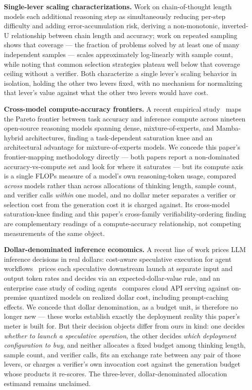 \documentclass[11pt]{article}
\begin{document}
\textbf{Single-lever scaling characterizations.} Work on chain-of-thought length~\citep{CoTLength6QDF} models each additional reasoning step as simultaneously reducing per-step difficulty and adding error-accumulation risk, deriving a non-monotonic, inverted-U relationship between chain length and accuracy; work on repeated sampling~\citep{BrownMonkeys240721787} shows that coverage --- the fraction of problems solved by at least one of many independent samples --- scales approximately log-linearly with sample count, while noting that common selection strategies plateau well below that coverage ceiling without a verifier. Both characterize a single lever's scaling behavior in isolation, holding the other two levers fixed, with no mechanism for normalizing that lever's value against what the other two levers would have cost.

\textbf{Cross-model compute-accuracy frontiers.} A recent empirical study~\citep{ComputeAccuracy251224776} maps the Pareto frontier between task accuracy and inference compute across nineteen open-source reasoning models spanning dense, mixture-of-experts, and Mamba-hybrid architectures, finding a task-dependent saturation knee and an architectural advantage for mixture-of-experts models. We concede this paper's frontier-mapping methodology directly --- both papers report a non-dominated accuracy-vs-compute set and look for where it saturates --- but its compute axis is a single FLOPs measure of a model's own reasoning-token usage, compared \emph{across} models rather than across allocations of thinking length, sample count, and verifier calls \emph{within} one model, and no dollar meter separates a verifier or selection cost from the generation cost it is charged against. Its cross-model saturation-knee finding and this paper's cross-family verifiability-ordering finding are complementary readings of a compute-accuracy relationship, not competing measurements of the same object.

\textbf{Dollar-denominated inference economics.} A recent line of work prices LLM inference decisions in real dollars: cost-aware speculative execution for agent workflows~\citep{SpecExec260607846} prices each speculative downstream launch at separate input and output token rates and decides via an expected-dollar-value rule, and an enterprise case study of coding agents~\citep{InferEcon260713080} compares cloud API serving against on-premise quantized models on realized dollar cost, including prompt-caching effects. We concede that dollar denomination, as a budget unit, is therefore no longer new --- these works establish exactly the deployment reality this paper's meter is built for. But their decision objects differ from ours in kind: one decides \emph{whether to launch a speculative operation}, the other decides \emph{which deployment configuration to buy}, and neither allocates a fixed budget among thinking length, sample count, and verifier calls, fits an exchange rate between any pair of those levers, or charges a verifier's own invocation cost against the generation budget whose products it re-scores. The three-lever, dollar-denominated allocation estimand remains unclaimed.
\end{document}
